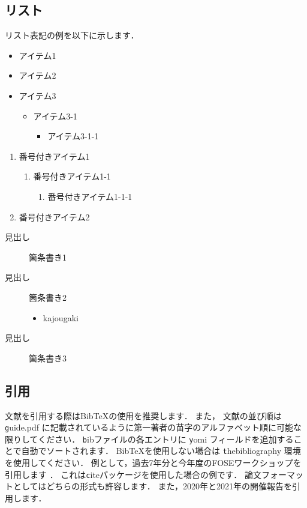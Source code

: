 \documentclass[T,J]{fose} %
\begin{document}
\subsection{リスト}

リスト表記の例を以下に示します．

\begin{itemize}
	\item アイテム1
	\item アイテム2
	\item アイテム3
	\begin{itemize}
		\item アイテム3-1
		\begin{itemize}
			\item アイテム3-1-1
		\end{itemize}
	\end{itemize}
\end{itemize}

\newpage

\begin{enumerate}
	\item 番号付きアイテム1
	\begin{enumerate}
		\item 番号付きアイテム1-1
		\begin{enumerate}
			\item 番号付きアイテム1-1-1
		\end{enumerate}
	\end{enumerate}
	\item 番号付きアイテム2
\end{enumerate}

\begin{description}
	\item[見出し] 箇条書き1
	\item[見出し] 箇条書き2
		\begin{itemize}
			\item kajougaki
		\end{itemize}
	\item[見出し] 箇条書き3
\end{description}


\subsection{引用}
文献を引用する際はBibTeXの使用を推奨します．
また， 文献の並び順は{\texttt guide.pdf} に記載されているように第一著者の苗字のアルファベット順に可能な限りしてください．
{\texttt bib}ファイルの各エントリに {\texttt yomi} フィールドを追加することで自動でソートされます．
BibTeXを使用しない場合は {\texttt thebibliography} 環境を使用してください．
例として，過去7年分と今年度のFOSEワークショップを引用します
\cite{fose2015}
\cite{fose2016}
\cite{fose2017}
\cite{fose2018}
\cite{fose2019}
\cite{fose2020}
\cite{fose2021}
\cite{fose2022}
\cite{fose2023}
．
これは{\texttt cite}パッケージを使用した場合の例です\cite{fose2015,fose2016,fose2017,fose2018,fose2019,fose2020,fose2021,fose2022,fose2023}．
論文フォーマットとしてはどちらの形式も許容します．
また，2020年と2021年の開催報告を引用します\cite{fose2020report}\cite{fose2021report}．
\end{document}

